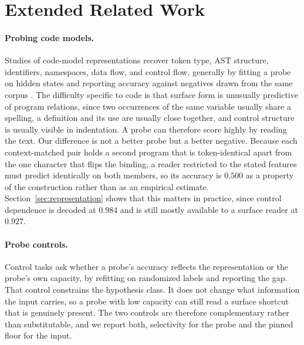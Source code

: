 \documentclass{article}
\begin{document}
\section{Extended Related Work}
\label{app:related}

\paragraph{Probing code models.}
Studies of code-model representations recover token type, AST structure, identifiers, namespaces, data flow, and control flow, generally by fitting a probe on hidden states and reporting accuracy against negatives drawn from the same corpus \citep{wan2022capture,hernandez2022astprobe,troshin2022probing,ma2024unveiling}. The difficulty specific to code is that surface form is unusually predictive of program relations, since two occurrences of the same variable usually share a spelling, a definition and its use are usually close together, and control structure is usually visible in indentation. A probe can therefore score highly by reading the text. Our difference is not a better probe but a better negative. Because each context-matched pair holds a second program that is token-identical apart from the one character that flips the binding, a reader restricted to the stated features must predict identically on both members, so its accuracy is $0.500$ as a property of the construction rather than as an empirical estimate. Section~\ref{sec:representation} shows that this matters in practice, since control dependence is decoded at $0.984$ and is still mostly available to a surface reader at $0.927$.

\paragraph{Probe controls.}
Control tasks \citep{hewitt2019control} ask whether a probe's accuracy reflects the representation or the probe's own capacity, by refitting on randomized labels and reporting the gap. That control constrains the hypothesis class. It does not change what information the input carries, so a probe with low capacity can still read a surface shortcut that is genuinely present. The two controls are therefore complementary rather than substitutable, and we report both, selectivity for the probe and the pinned floor for the input.
\end{document}
